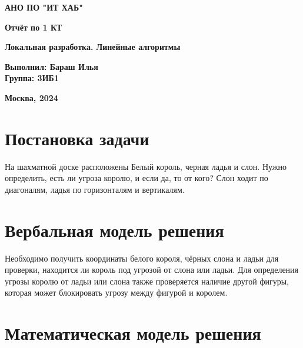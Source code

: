 \documentclass{article}
\begin{document}
\begin{titlepage}
\centering
\textbf{\LARGE АНО ПО "ИТ ХАБ"}

 
\vspace{1cm}

\textbf{\LARGE Отчёт по 1 КТ}

\vspace{1cm}
    
\textbf{\LARGE Локальная разработка. Линейные алгоритмы}

\vfill

\begin{flushright}
\textbf{\normalsize Выполнил: Бараш Илья} \\
\textbf{\normalsize Группа: 3ИБ1}
\end{flushright}
    
\vspace{1cm}
\centering
\textbf{\Large Москва, 2024}
\end{titlepage}

\newpage


\section{Постановка задачи}

На шахматной доске расположены Белый король, черная ладья и слон. Нужно определить, есть ли угроза королю, и если да, то от кого? Слон ходит по диагоналям, ладья по горизонталям и вертикалям.

\section{Вербальная модель решения}

Необходимо получить координаты белого короля, чёрных слона и ладьи для проверки, находится ли король под угрозой от слона или ладьи. Для определения угрозы королю от ладьи или слона также проверяется наличие другой фигуры, которая может блокировать угрозу между фигурой и королем.

\section{Математическая модель решения}

\newpage
\end{document}
